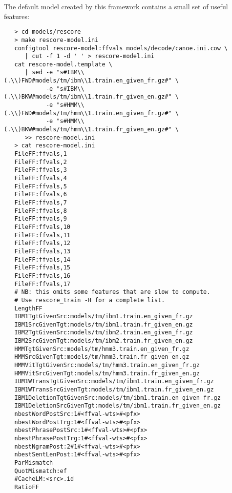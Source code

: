 \documentclass[11pt,letterpaper]{article}
\begin{document}
The default model created by this framework contains a small set of useful
features:
\begin{small}
\begin{verbatim}
   > cd models/rescore
   > make rescore-model.ini
   configtool rescore-model:ffvals models/decode/canoe.ini.cow \
      | cut -f 1 -d ' ' > rescore-model.ini
   cat rescore-model.template \
      | sed -e "s#IBM\\(.\\)FWD#models/tm/ibm\\1.train.en_given_fr.gz#" \
            -e "s#IBM\\(.\\)BKW#models/tm/ibm\\1.train.fr_given_en.gz#" \
            -e "s#HMM\\(.\\)FWD#models/tm/hmm\\1.train.en_given_fr.gz#" \
            -e "s#HMM\\(.\\)BKW#models/tm/hmm\\1.train.fr_given_en.gz#" \
      >> rescore-model.ini
   > cat rescore-model.ini
   FileFF:ffvals,1
   FileFF:ffvals,2
   FileFF:ffvals,3
   FileFF:ffvals,4
   FileFF:ffvals,5
   FileFF:ffvals,6
   FileFF:ffvals,7
   FileFF:ffvals,8
   FileFF:ffvals,9
   FileFF:ffvals,10
   FileFF:ffvals,11
   FileFF:ffvals,12
   FileFF:ffvals,13
   FileFF:ffvals,14
   FileFF:ffvals,15
   FileFF:ffvals,16
   FileFF:ffvals,17
   # NB: this omits some features that are slow to compute.
   # Use rescore_train -H for a complete list.
   LengthFF
   IBM1TgtGivenSrc:models/tm/ibm1.train.en_given_fr.gz
   IBM1SrcGivenTgt:models/tm/ibm1.train.fr_given_en.gz
   IBM2TgtGivenSrc:models/tm/ibm2.train.en_given_fr.gz
   IBM2SrcGivenTgt:models/tm/ibm2.train.fr_given_en.gz
   HMMTgtGivenSrc:models/tm/hmm3.train.en_given_fr.gz
   HMMSrcGivenTgt:models/tm/hmm3.train.fr_given_en.gz
   HMMVitTgtGivenSrc:models/tm/hmm3.train.en_given_fr.gz
   HMMVitSrcGivenTgt:models/tm/hmm3.train.fr_given_en.gz
   IBM1WTransTgtGivenSrc:models/tm/ibm1.train.en_given_fr.gz
   IBM1WTransSrcGivenTgt:models/tm/ibm1.train.fr_given_en.gz
   IBM1DeletionTgtGivenSrc:models/tm/ibm1.train.en_given_fr.gz
   IBM1DeletionSrcGivenTgt:models/tm/ibm1.train.fr_given_en.gz
   nbestWordPostSrc:1#<ffval-wts>#<pfx>
   nbestWordPostTrg:1#<ffval-wts>#<pfx>
   nbestPhrasePostSrc:1#<ffval-wts>#<pfx>
   nbestPhrasePostTrg:1#<ffval-wts>#<pfx>
   nbestNgramPost:2#1#<ffval-wts>#<pfx>
   nbestSentLenPost:1#<ffval-wts>#<pfx>
   ParMismatch
   QuotMismatch:ef
   #CacheLM:<src>.id
   RatioFF
\end{verbatim}
\end{small}
\end{document}
